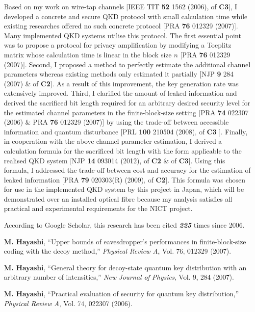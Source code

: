Based on my work on wire-tap channels 
[IEEE TIT \textbf{52} 1562 (2006), \cite{Ha03b} of \textbf{C3}], %
I developed a concrete and secure QKD protocol with small calculation time
while existing researches offered no such concrete protocol
[PRA \textbf{76} 012329 (2007)]. %
Many implemented QKD systems utilise this protocol. 
The first essential point was to propose a protocol 
for privacy amplification by modifying a Toeplitz matrix whose calculation time is linear in the block size $n$ 
[PRA \textbf{76} 012329 (2007)]. 
Second, I proposed a method to perfectly estimate the additional channel parameters
whereas existing methods only estimated it partially 
[NJP \textbf{9} 284 (2007) \& \cite{Hp8} of \textbf{C2}]. %
As a result of this improvement, the key generation rate was extensively improved. 
Third, I clarified the amount of leaked information and derived the sacrificed bit length required for an arbitrary desired security 
level for the estimated channel parameters in 
the finite-block-size setting 
[PRA \textbf{74} 022307 (2006) %
\& PRA \textbf{76} 012329 (2007)] by using the trade-off between accessible information and quantum disturbance 
[PRL \textbf{100} 210504 (2008), \cite{BHH08} of \textbf{C3} ]. %
Finally, in cooperation with the above channel parameter estimation, I derived a calculation formula for the sacrificed bit length with the form applicable to the realised QKD system 
[NJP \textbf{14} 093014 (2012), \cite{HT12} of \textbf{C2} \& \cite{Hp8} of \textbf{C3}]. %
Using this formula, I addressed the trade-off between cost and accuracy for the estimation of leaked information 
[PRA \textbf{79} 020303(R) (2009), \cite{Ha09-1} of \textbf{C2}]. %
This formula was chosen for use in the implemented QKD system by this project in Japan, 
which will be demonstrated over an installed optical fibre
because my analysis satisfies all practical and experimental requirements for the NICT project.

According to Google Scholar, this research has been cited \textbf{\textit{225}}
 times since 2006.

\renewcommand{\refname}{}
\vspace{-20 mm}
\begin{thebibliography}{99}

\textbf{M. Hayashi},
``Upper bounds of eavesdropper's performances in finite-block-size coding with the decoy method,'' 
{\em Physical Review A}, Vol. 76, 012329 (2007).

\textbf{M. Hayashi},
``General theory for decoy-state quantum key distribution with an arbitrary number of intensities,'' 
{\em New Journal of Physics}, Vol. 9, 284 (2007).

\textbf{M. Hayashi},
``Practical evaluation of security for quantum key distribution,'' 
{\em Physical Review A}, Vol. 74, 022307 (2006).

\end{thebibliography}

